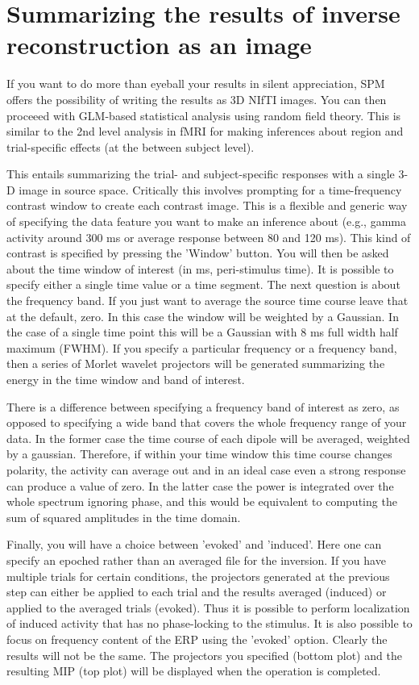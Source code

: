 \section{Summarizing the results of inverse reconstruction as an image}
If you want to do more than eyeball your results in silent appreciation, SPM offers the possibility of writing the results as 3D NIfTI images. You can then proceeed with GLM-based statistical analysis using random field theory.
This is similar
to the 2nd level analysis in fMRI for making inferences about region and trial-specific effects (at the between subject level).

This entails summarizing the trial- and subject-specific responses with a single 3-D
image in source space. Critically this involves prompting for a time-frequency contrast window to create each contrast image.
This is a flexible and generic way of specifying the data feature you want to make an inference about (e.g., gamma activity around 300
ms or average response between 80 and 120 ms). This kind of contrast is specified by pressing the 'Window' button. 
You will then be asked about
the time window of interest (in ms, peri-stimulus time). It is possible to specify either a single time value or a time segment. The next question is about the frequency band.
If you just want to average the source time course leave that at the default, zero. In this case the window will
be weighted by a Gaussian. In the case of a single time point this will be a Gaussian with 8 ms full width half maximum (FWHM).
If you specify a particular frequency or a frequency band, then a series of Morlet wavelet projectors
will be generated summarizing the energy in the time window and band of interest. 

There is a difference between specifying a frequency band of interest as zero, as opposed
to specifying a wide band that covers the whole frequency range of your data. In the former case the time course of each dipole will be averaged, weighted by a gaussian. Therefore,
if within your time window this time course changes polarity, the activity can average out and in an ideal case even a strong response can produce a value of zero. In the latter case
the power is integrated over the whole spectrum ignoring phase, and this would be equivalent to computing the sum of squared amplitudes in the time domain.

Finally, you will have a choice between 'evoked' and 'induced'. Here one can specify an epoched rather than an averaged file for the inversion. If you have multiple trials for certain conditions,
the projectors generated at the previous step can either be applied to each trial and the results averaged (induced) or applied to the averaged trials (evoked). Thus it is
possible to perform localization of induced activity that has no phase-locking to the stimulus. It is also possible to focus on frequency content of the ERP using the 'evoked'
option. Clearly the results will not be the same. The projectors you specified (bottom plot) and the resulting MIP (top plot) will be displayed when the operation is completed.

